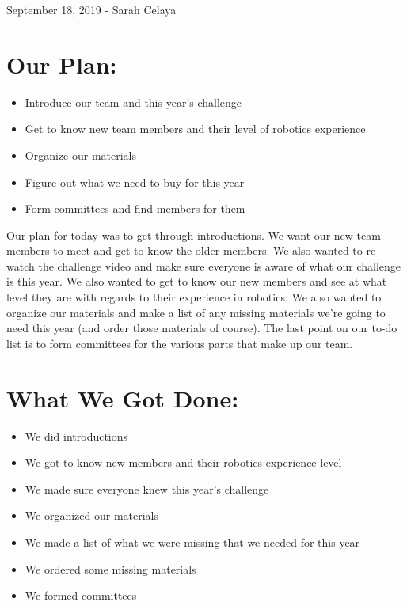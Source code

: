 \documentclass[12pt]{article}
\begin{document}
September 18, 2019 - Sarah Celaya

\section{Our Plan:} %
\begin{itemize}
	\item Introduce our team and this year’s challenge
\item Get to know new team members and their level of robotics experience
\item Organize our materials
\item Figure out what we need to buy for this year
\item Form committees and find members for them
\end{itemize}

Our plan for today was to get through introductions. We want our new team members to meet and get to know the older members. We also wanted to re-watch the challenge video and make sure everyone is aware of what our challenge is this year. We also wanted to get to know our new members and see at what level they are with regards to their experience in robotics. We also wanted to organize our materials and make a list of any missing materials we’re going to need this year (and order those materials of course). The last point on our to-do list is to form committees for the various parts that make up our team.

\section{What We Got Done:} %
\begin{itemize}
	\item We did introductions
\item We got to know new members and their robotics experience level
\item We made sure everyone knew this year’s challenge
\item We organized our materials
\item We made a list of what we were missing that we needed for this year
\item We ordered some missing materials
\item We formed committees
\end{itemize}
\end{document}
